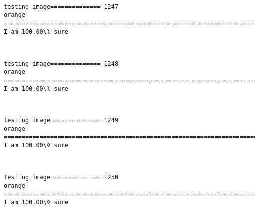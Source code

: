 \documentclass[11pt]{article}
\begin{document}
    \begin{center}
    \end{center}
    { \hspace*{\fill} \\}
    
    \begin{Verbatim}[commandchars=\\\{\}]
testing image============== 1247
orange
============================================================================
I am 100.00\% sure

    \end{Verbatim}

    \begin{center}
    \end{center}
    { \hspace*{\fill} \\}
    
    \begin{Verbatim}[commandchars=\\\{\}]
testing image============== 1248
orange
============================================================================
I am 100.00\% sure

    \end{Verbatim}

    \begin{center}
    \end{center}
    { \hspace*{\fill} \\}
    
    \begin{Verbatim}[commandchars=\\\{\}]
testing image============== 1249
orange
============================================================================
I am 100.00\% sure

    \end{Verbatim}

    \begin{center}
    \end{center}
    { \hspace*{\fill} \\}
    
    \begin{Verbatim}[commandchars=\\\{\}]
testing image============== 1250
orange
============================================================================
I am 100.00\% sure

    \end{Verbatim}
\end{document}
